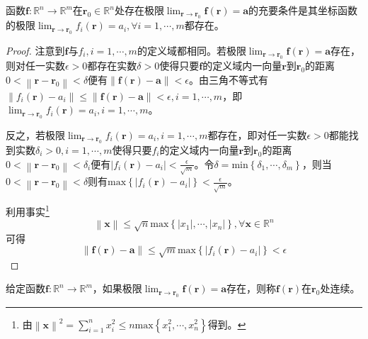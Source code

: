 \documentclass[main.tex]{subfiles}
\begin{document}
\begin{theorem}\label{thm:II.2.2}
函数$\mathbf{f}:\mathbb{R}^n\rightarrow\mathbb{R}^m$在$\mathbf{r}_0\in\mathbb{R}^n$处存在极限$\lim_{\mathbf{r}\to\mathbf{r}_0}\mathbf{f}\left(\mathbf{r}\right)=\mathbf{a}$的充要条件是其坐标函数的极限$\lim_{\mathbf{r}\to\mathbf{r}_0}f_i\left(\mathbf{r}\right)=a_i,\forall i=1,\cdots,m$都存在。
\end{theorem}
\begin{proof}
注意到$\mathbf{f}$与$f_i,i=1,\cdots,m$的定义域都相同。若极限$\lim_{\mathbf{r}\to\mathbf{r}_0}\mathbf{f}\left(\mathbf{r}\right)=\mathbf{a}$存在，则对任一实数$\epsilon>0$都存在实数$\delta>0$使得只要$\mathbf{f}$的定义域内一向量$\mathbf{r}$到$\mathbf{r}_0$的距离$0<\left\|\mathbf{r}-\mathbf{r}_0\right\|<\delta$便有$\left\|\mathbf{f}\left(\mathbf{r}\right)-\mathbf{a}\right\|<\epsilon$。由三角不等式有$\left\|f_i\left(\mathbf{r}\right)-a_i\right\|\leq\left\|\mathbf{f}\left(\mathbf{r}\right)-\mathbf{a}\right\|<\epsilon,i=1,\cdots,m$，即$\lim_{\mathbf{r}\to\mathbf{r}_0}f_i\left(\mathbf{r}\right)=a_i,i=1,\cdots,m$。

反之，若极限$\lim_{\mathbf{r}\to\mathbf{r}_0}f_i\left(\mathbf{r}\right)=a_i,i=1,\cdots,m$都存在，即对任一实数$\epsilon>0$都能找到实数$\delta_i>0,i=1,\cdots,m$使得只要$f_i$的定义域内一向量$\mathbf{r}$到$\mathbf{r}_0$的距离$0<\left\|\mathbf{r}-\mathbf{r}_0\right\|<\delta_i$便有$\left|f_i\left(\mathbf{r}\right)-a_i\right|<\frac{\epsilon}{\sqrt{m}}$。令$\delta=\mathrm{min}\left\{\delta_1,\cdots,\delta_m\right\}$，则当$0<\left\|\mathbf{r}-\mathbf{r}_0\right\|<\delta$则有$\mathrm{max}\left\{\left|f_i\left(\mathbf{r}\right)-a_i\right|\right\}<\frac{\epsilon}{\sqrt{m}}$。

利用事实\footnote{
由$\left\|\mathbf{x}\right\|^2=\sum_{i=1}^nx_i^2\leq n\mathrm{max}\left\{x_1^2,\cdots,x_n^2\right\}$得到。
}
\[\left\|\mathbf{x}\right\|\leq\sqrt{n}\mathrm{max}\left\{\left|x_1\right|,\cdots,\left|x_n\right|\right\},\forall\mathbf{x}\in\mathbb{R}^n\]
可得
\[\left\|\mathbf{f}\left(\mathbf{r}\right)-\mathbf{a}\right\|\leq\sqrt{m}\mathrm{max}\left\{\left|f_i\left(\mathbf{r}\right)-a_i\right|\right\}<\epsilon\]
\end{proof}

\begin{definition}[函数的连续性]
给定函数$\mathbf{f}:\mathbb{R}^n\rightarrow\mathbb{R}^m$，如果极限$\lim_{\mathbf{r}\to\mathbf{r}_0}\mathbf{f}\left(\mathbf{r}\right)=\mathbf{a}$存在，则称$\mathbf{f}\left(\mathbf{r}\right)$在$\mathbf{r}_0$处连续。
\end{definition}
\end{document}
